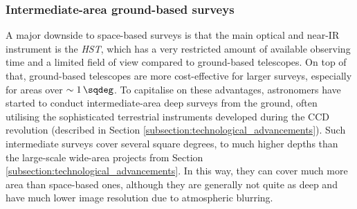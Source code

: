 \subsubsection{Intermediate-area ground-based surveys}\label{subsubsection:ground_based_surveys}
A major downside to space-based surveys is that the main optical and near-IR instrument is the \textit{HST}, which has a very restricted amount of available observing time and a limited field of view compared to ground-based telescopes. On top of that, ground-based telescopes are more cost-effective for larger surveys, especially for areas over $\sim \SI{1}{\sqdeg}$. To capitalise on these advantages, astronomers have started to conduct intermediate-area deep surveys from the ground, often utilising the sophisticated terrestrial instruments developed during the CCD revolution (described in Section \ref{subsection:technological_advancements}).  Such intermediate surveys cover several square degrees, to much higher depths than the large-scale wide-area projects from Section \ref{subsection:technological_advancements}. In this way, they can cover much more area than space-based ones, although they are generally not quite as deep and have much lower image resolution due to atmospheric blurring. \par 


